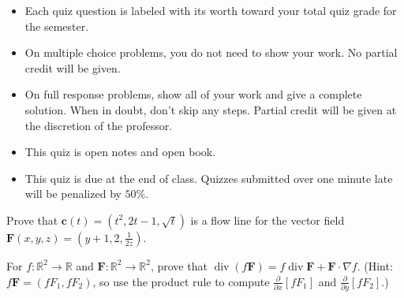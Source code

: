 \documentclass[12pt]{exam}
\newcommand{\vect}[1]{\ensuremath{\mathbf{#1}}}
\newcommand{\<}{(}
\renewcommand{\>}{)}
\newcommand{\p}{\partial}
\begin{document}
\begin{center}
\end{center}
\vspace{0.1in}

\vspace{12pt}

\begin{itemize}
  \item Each quiz question is labeled with its worth toward your total quiz
        grade for the semester.
  \item On multiple choice problems, you do not need to show your work. No
        partial credit will be given.
  \item On full response problems, show all of your work and give a
        complete solution. When in doubt, don't skip any steps. Partial
        credit will be given at the discretion of the professor.
  \item This quiz is open notes and open book.
  \item This quiz is due at the end of class. Quizzes submitted over one minute
        late will be penalized by \(50\%\).
\end{itemize}

\newpage

\begin{questions}

\question[10]
Prove that \(\vect c(t)=\<t^2,2t-1,\sqrt t\>\) is a flow line for
the vector field \(\vect F(x,y,z)=\<y+1,2,\frac{1}{2z}\>\).


\vfill\vfill
\newcommand{\dv}{\operatorname{div}}
\question[10]
For \(f:\mathbb R^2\to\mathbb R\) and \(\vect F:\mathbb R^2\to\mathbb R^2\),
prove that \(\dv(f\vect F)=f\dv\vect F+\vect F\cdot\nabla f\).
(Hint: \(f\vect F=\<fF_1,fF_2\>\), so
use the product rule to compute \(\frac{\p}{\p x}[fF_1]\)
and \(\frac{\p}{\p y}[fF_2]\).)


\vfill\vfill\vfill
\end{questions}
\end{document}

